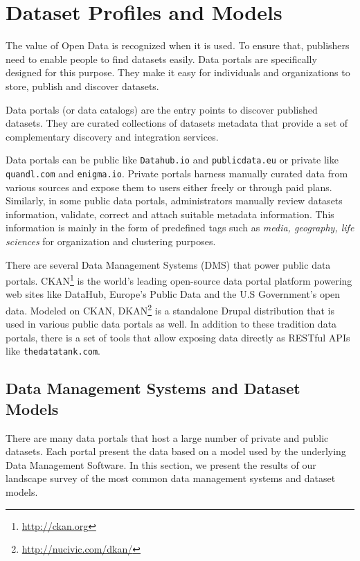 \chapter{Dataset Profiles and Models}\label{chapter:hdl}
\graphicspath{{part1/chapter1/figures/}}

The value of Open Data is recognized when it is used. To ensure that, publishers need to enable people to find datasets easily. Data portals are specifically designed for this purpose. They make it easy for individuals and organizations to store, publish and discover datasets.

Data portals (or data catalogs) are the entry points to discover published datasets. They are curated collections of datasets metadata that provide a set of complementary discovery and integration  services.

Data portals can be public like \texttt{Datahub.io} and \texttt{publicdata.eu} or private like \texttt{quandl.com} and \texttt{enigma.io}. Private portals harness manually curated data from various sources and expose them to users either freely or through paid plans. Similarly, in some public data portals, administrators manually review datasets information, validate, correct and attach suitable metadata information. This information is mainly in the form of predefined tags such as \textit{media, geography, life sciences} for organization and clustering purposes.

There are several Data Management Systems (DMS) that power public data portals. CKAN\footnote{\url{http://ckan.org}} is the world's leading open-source data portal platform powering web sites like DataHub, Europe's Public Data and the U.S Government's open data. Modeled on CKAN, DKAN\footnote{\url{http://nucivic.com/dkan/}} is a standalone Drupal distribution that is used in various public data portals as well. In addition to these tradition data portals, there is a set of tools that allow exposing data directly as RESTful APIs like \texttt{thedatatank.com}.


\section{Data Management Systems and Dataset Models}
\label{section:datasetModels}

There are many data portals that host a large number of private and public datasets. Each portal present the data based on a model used by the underlying Data Management Software. In this section, we present the results of our landscape survey of the most common data management systems and dataset models.

